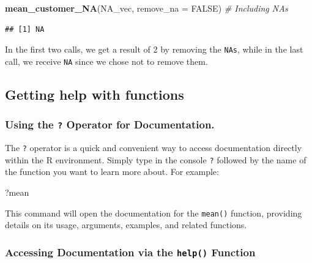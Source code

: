 \documentclass[
]{book}
\newenvironment{Shaded}{\begin{snugshade}}{\end{snugshade}}
\newcommand{\AttributeTok}[1]{\textcolor[rgb]{0.13,0.29,0.53}{#1}}
\newcommand{\CommentTok}[1]{\textcolor[rgb]{0.56,0.35,0.01}{\textit{#1}}}
\newcommand{\ConstantTok}[1]{\textcolor[rgb]{0.56,0.35,0.01}{#1}}
\newcommand{\FunctionTok}[1]{\textcolor[rgb]{0.13,0.29,0.53}{\textbf{#1}}}
\newcommand{\NormalTok}[1]{#1}
\begin{document}
\begin{Shaded}
\begin{Highlighting}[]
\FunctionTok{mean\_customer\_NA}\NormalTok{(NA\_vec, }\AttributeTok{remove\_na =} \ConstantTok{FALSE}\NormalTok{)  }\CommentTok{\# Including NAs}
\end{Highlighting}
\end{Shaded}

\begin{verbatim}
## [1] NA
\end{verbatim}

In the first two calls, we get a result of 2 by removing the \texttt{NAs}, while in the last call, we receive \texttt{NA} since we chose not to remove them.

\hypertarget{getting-help-with-functions}{%
\subsection{Getting help with functions}\label{getting-help-with-functions}}

\hypertarget{using-the-operator-for-documentation.}{%
\subsubsection{\texorpdfstring{Using the \texttt{?} Operator for Documentation.}{Using the ? Operator for Documentation.}}\label{using-the-operator-for-documentation.}}

The \texttt{?} operator is a quick and convenient way to access documentation directly within the R environment. Simply type in the console \texttt{?} followed by the name of the function you want to learn more about. For example:

\begin{Shaded}
\begin{Highlighting}[]
\NormalTok{?mean}
\end{Highlighting}
\end{Shaded}

This command will open the documentation for the \texttt{mean()} function, providing details on its usage, arguments, examples, and related functions.

\hypertarget{accessing-documentation-via-the-help-function}{%
\subsubsection{\texorpdfstring{Accessing Documentation via the \texttt{help()} Function}{Accessing Documentation via the help() Function}}\label{accessing-documentation-via-the-help-function}}
\end{document}
